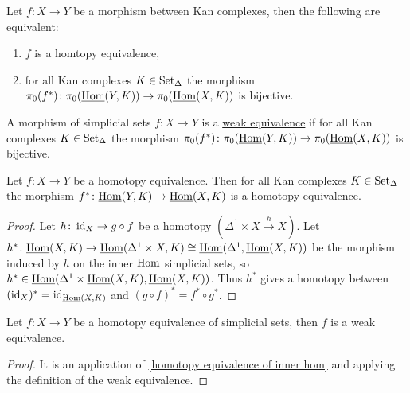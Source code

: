 \begin{prop}
\label{Homtopy eq. of Kan complexes are bij in pi_0(weak eq.)}
    Let $f\colon X \to Y$ be a morphism between Kan complexes, then the following are equivalent:
    \begin{enumerate}
        \item 
        $f$ is a homtopy equivalence,
        \item 
        for all Kan complexes $K \in \operatorname{Set}_{\Delta}$ the morphism $\pi_0(f^*) \colon \pi_0(\underline{\operatorname{Hom}}(Y,K)) \to \pi_0(\underline{\operatorname{Hom}}(X,K))$ is bijective.
    \end{enumerate}
\end{prop}

\begin{defi}
\label{weak equivalence}
    A morphism of simplicial sets $f\colon X \to Y$ is a \underline{weak equivalence} if for all Kan complexes $K \in \operatorname{Set}_{\Delta}$ the morphism $\pi_0(f^*) \colon \pi_0(\underline{\operatorname{Hom}}(Y,K)) \to \pi_0(\underline{\operatorname{Hom}}(X,K))$ is bijective.
\end{defi}

\begin{lem}
\label{homotopy equivalence of inner hom}
    Let $f\colon X \to Y$ be a homotopy equivalence. 
    Then for all Kan complexes $K \in \operatorname{Set}_{\Delta}$ the morphism $f^*\colon \underline{\operatorname{Hom}}(Y,K) \to \underline{\operatorname{Hom}}(X,K)$ is a homotopy equivalence.
\end{lem}

\begin{proof}
    Let $h\colon \operatorname{id}_X \to g \circ f$ be a homotopy $(\Delta^1 \times X \xrightarrow{h} X)$.
    Let $h^*\colon \underline{\operatorname{Hom}}(X,K) \to \underline{\operatorname{Hom}}(\Delta^1 \times X,K) \cong \underline{\operatorname{Hom}}(\Delta^1 , \underline{\operatorname{Hom}}(X,K))$ be the morphism induced by $h$ on the inner $\operatorname{Hom}$ simplicial sets, so $h^* \in \underline{\operatorname{Hom}}(\Delta^1 \times \underline{\operatorname{Hom}}(X,K), \underline{\operatorname{Hom}}(X,K))$.
    Thus $h^*$ gives a homotopy between $(\operatorname{id}_X)^*=\operatorname{id}_{\underline{\operatorname{Hom}}(X,K)}$ and $(g \circ f)^* = f^* \circ g^*$.
\end{proof}

\begin{cor}
    Let $f \colon X  \to  Y$ be a homotopy equivalence of simplicial sets, then $f$ is a weak equivalence.
\end{cor}

\begin{proof}
    It is an application of \cref{homotopy equivalence of inner hom} and applying the definition of the weak equivalence.
\end{proof}


